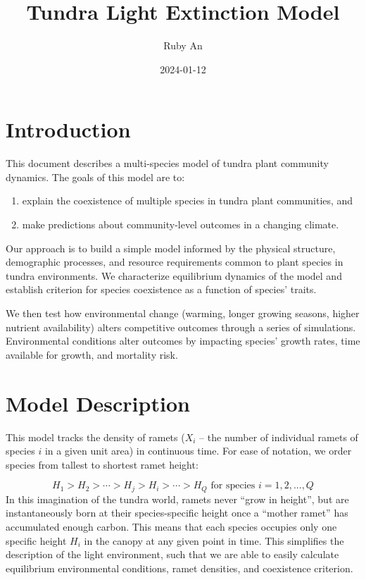 \documentclass[
]{article}
\title{Tundra Light Extinction Model}
\author{Ruby An}
\date{2024-01-12}
\providecommand{\tightlist}{%
  \setlength{\itemsep}{0pt}\setlength{\parskip}{0pt}}
\begin{document}
\maketitle

\section{Introduction}\label{introduction}

This document describes a multi-species model of tundra plant community
dynamics. The goals of this model are to:

\begin{enumerate}
\def\labelenumi{(\alph{enumi})}
\tightlist
\item
  explain the coexistence of multiple species in tundra plant
  communities, and
\item
  make predictions about community-level outcomes in a changing climate.
\end{enumerate}

Our approach is to build a simple model informed by the physical
structure, demographic processes, and resource requirements common to
plant species in tundra environments. We characterize equilibrium
dynamics of the model and establish criterion for species coexistence as
a function of species' traits.

We then test how environmental change (warming, longer growing seasons,
higher nutrient availability) alters competitive outcomes through a
series of simulations. Environmental conditions alter outcomes by
impacting species' growth rates, time available for growth, and
mortality risk.

\section{Model Description}\label{model-description}

This model tracks the density of ramets (\(X_{i}\) -- the number of
individual ramets of species \(i\) in a given unit area) in continuous
time. For ease of notation, we order species from tallest to shortest
ramet height:

\[ H_{1} > H_{2} > \cdots > H_{j} > H_{i} > \cdots > H_{Q} \text{ for species } i = 1, 2, ..., Q   \]
In this imagination of the tundra world, ramets never ``grow in
height'', but are instantaneously born at their species-specific height
once a ``mother ramet'' has accumulated enough carbon. This means that
each species occupies only one specific height \(H_i\) in the canopy at
any given point in time. This simplifies the description of the light
environment, such that we are able to easily calculate equilibrium
environmental conditions, ramet densities, and coexistence criterion.
\end{document}
